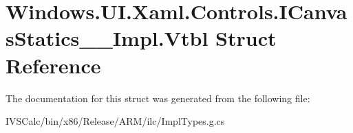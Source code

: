 \hypertarget{struct_windows_1_1_u_i_1_1_xaml_1_1_controls_1_1_i_canvas_statics_____impl_1_1_vtbl}{}\section{Windows.\+U\+I.\+Xaml.\+Controls.\+I\+Canvas\+Statics\+\_\+\+\_\+\+Impl.\+Vtbl Struct Reference}
\label{struct_windows_1_1_u_i_1_1_xaml_1_1_controls_1_1_i_canvas_statics_____impl_1_1_vtbl}


The documentation for this struct was generated from the following file\+:\begin{DoxyCompactItemize}
\item 
I\+V\+S\+Calc/bin/x86/\+Release/\+A\+R\+M/ilc/Impl\+Types.\+g.\+cs\end{DoxyCompactItemize}
